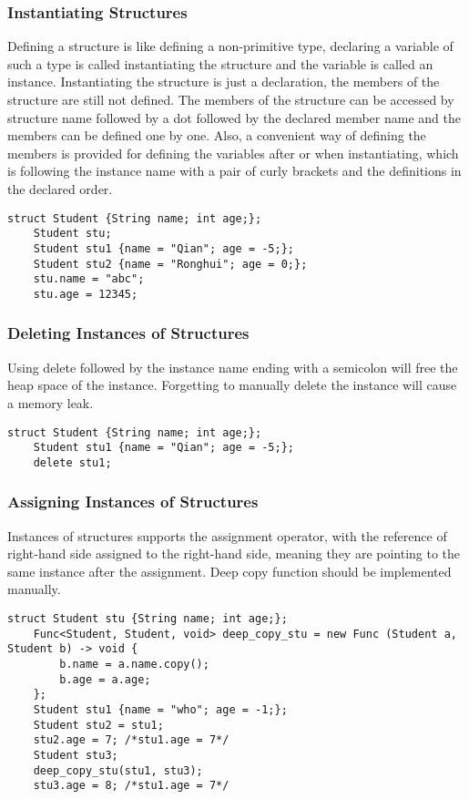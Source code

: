 \subsubsection{Instantiating Structures}
Defining a structure is like defining a non-primitive type, declaring a variable of such a type is called instantiating the structure and the variable is called an instance. Instantiating the structure is just a declaration, the members of the structure are still not defined. The members of the structure can be accessed by structure name followed by a dot followed by the declared member name and the members can be defined one by one. Also, a convenient way of defining the members is provided for defining the variables after or when instantiating, which is following the instance name with a pair of curly brackets and the definitions in the declared order.
\begin{lstlisting}[caption={struct\_instantiate.csm}, captionpos=b]
    struct Student {String name; int age;};
    Student stu;
    Student stu1 {name = "Qian"; age = -5;};
    Student stu2 {name = "Ronghui"; age = 0;};
    stu.name = "abc";
    stu.age = 12345;
\end{lstlisting}
\subsubsection{Deleting Instances of Structures}
Using delete followed by the instance name ending with a semicolon will free the heap space of the instance. Forgetting to manually delete the instance will cause a memory leak.
\begin{lstlisting}[caption={struct\_delete.csm}, captionpos=b]
    struct Student {String name; int age;};
    Student stu1 {name = "Qian"; age = -5;};
    delete stu1;
\end{lstlisting}
\subsubsection{Assigning Instances of Structures}
Instances of structures supports the assignment operator, with the reference of right-hand side assigned to the right-hand side, meaning they are pointing to the same instance after the assignment. Deep copy function should be implemented manually.
\begin{lstlisting}[caption={struct\_deep\_cpoy.csm}, captionpos=b]
    struct Student stu {String name; int age;};
    Func<Student, Student, void> deep_copy_stu = new Func (Student a, Student b) -> void {
        b.name = a.name.copy();
        b.age = a.age;
    };
    Student stu1 {name = "who"; age = -1;};
    Student stu2 = stu1;
    stu2.age = 7; /*stu1.age = 7*/
    Student stu3;
    deep_copy_stu(stu1, stu3);
    stu3.age = 8; /*stu1.age = 7*/
\end{lstlisting}


